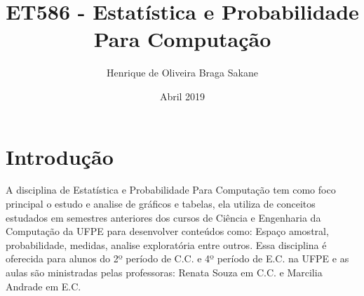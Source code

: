 \documentclass{article}
\title{ET586 - Estatística e Probabilidade Para Computação}
\author{Henrique de Oliveira Braga Sakane}
\date{Abril 2019}
\begin{document}
\maketitle

\section{Introdução}
    
 
A disciplina de Estatística e Probabilidade Para Computação tem como foco principal o estudo e analise de gráficos e tabelas, ela utiliza de conceitos estudados em semestres anteriores dos cursos de Ciência e Engenharia da Computação da UFPE para desenvolver conteúdos como: Espaço amostral, probabilidade, medidas, analise exploratória entre outros.
Essa disciplina é oferecida para alunos do 2º período de C.C. e 4º período de E.C. na UFPE e as aulas são ministradas pelas professoras: Renata Souza em C.C. e Marcilia Andrade em E.C.
\end{document}
